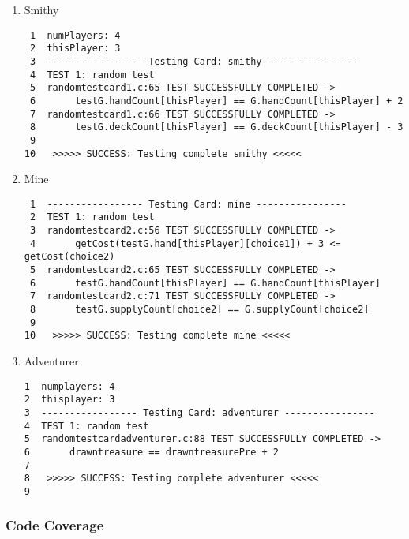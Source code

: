 \documentclass[11pt]{article}
\begin{document}
\begin{enumerate}
\item Smithy
\label{sec:smithy}
\begin{verbatim}
 1  numPlayers: 4
 2  thisPlayer: 3
 3  ----------------- Testing Card: smithy ----------------
 4  TEST 1: random test
 5  randomtestcard1.c:65 TEST SUCCESSFULLY COMPLETED ->
 6       testG.handCount[thisPlayer] == G.handCount[thisPlayer] + 2
 7  randomtestcard1.c:66 TEST SUCCESSFULLY COMPLETED ->
 8       testG.deckCount[thisPlayer] == G.deckCount[thisPlayer] - 3
 9  
10   >>>>> SUCCESS: Testing complete smithy <<<<<
\end{verbatim}

\item Mine
\label{sec:mine}
\begin{verbatim}
 1  ----------------- Testing Card: mine ----------------
 2  TEST 1: random test
 3  randomtestcard2.c:56 TEST SUCCESSFULLY COMPLETED ->
 4       getCost(testG.hand[thisPlayer][choice1]) + 3 <= getCost(choice2)
 5  randomtestcard2.c:65 TEST SUCCESSFULLY COMPLETED ->
 6       testG.handCount[thisPlayer] == G.handCount[thisPlayer]
 7  randomtestcard2.c:71 TEST SUCCESSFULLY COMPLETED ->
 8       testG.supplyCount[choice2] == G.supplyCount[choice2]
 9  
10   >>>>> SUCCESS: Testing complete mine <<<<<
\end{verbatim}

\item Adventurer
\label{sec:adventurer}
\begin{verbatim}
1  numplayers: 4
2  thisplayer: 3
3  ----------------- Testing Card: adventurer ----------------
4  TEST 1: random test
5  randomtestcardadventurer.c:88 TEST SUCCESSFULLY COMPLETED ->
6       drawntreasure == drawntreasurePre + 2
7  
8   >>>>> SUCCESS: Testing complete adventurer <<<<<
9      
\end{verbatim}
\end{enumerate}

\subsubsection{Code Coverage}
\label{sec:codecoverage1}
\end{document}
